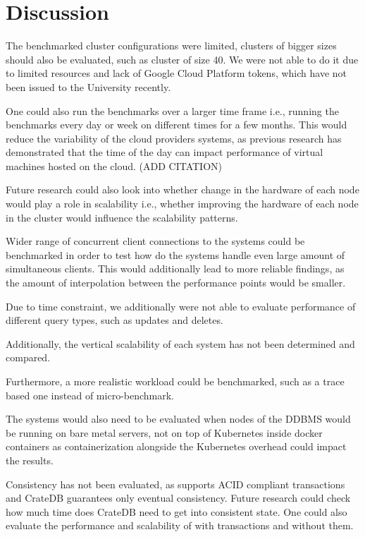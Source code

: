 \section{Discussion}
\label{cha:discussion}

The benchmarked cluster configurations were limited, clusters of bigger sizes should also be evaluated, such as cluster of size 40.
We were not able to do it due to limited resources and lack of Google Cloud Platform tokens, which have not been issued to the University recently.

One could also run the benchmarks over a larger time frame i.e., running the benchmarks every day or week on different times for a few months.
This would reduce the variability of the cloud providers systems, as previous research has demonstrated that the time of the day can impact performance of virtual machines hosted on the cloud. (ADD CITATION)

Future research could also look into whether change in the hardware of each node would play a role in scalability i.e., whether improving the hardware of each node in the cluster would influence the scalability patterns.

Wider range of concurrent client connections to the systems could be benchmarked in order to test how do the systems handle even large amount of simultaneous clients.
This would additionally lead to more reliable findings, as the amount of interpolation between the performance points would be smaller.

Due to time constraint, we additionally were not able to evaluate performance of different query types, such as updates and deletes.

Additionally, the vertical scalability of each system has not been determined and compared.

Furthermore, a more realistic workload could be benchmarked, such as a trace based one instead of micro-benchmark.

The systems would also need to be evaluated when nodes of the DDBMS would be running on bare metal servers, not on top of Kubernetes inside docker containers as containerization alongside the Kubernetes overhead could impact the results.

Consistency has not been evaluated, as \mobilitydbc supports ACID compliant transactions and CrateDB guarantees only eventual consistency.
Future research could check how much time does CrateDB need to get into consistent state.
One could also evaluate the performance and scalability of \mobilitydbc with transactions and without them.
